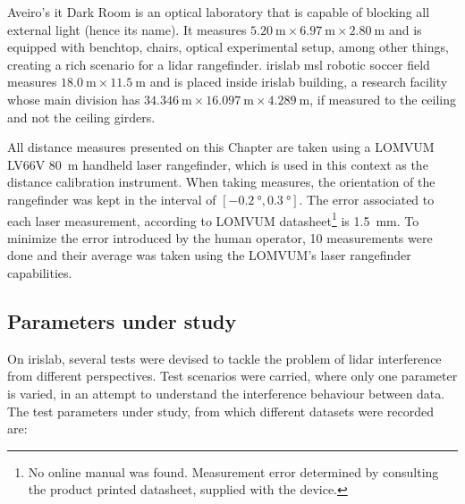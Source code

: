 Aveiro's \ac{it} Dark Room is an optical laboratory that is capable of blocking all external light (hence its name). It measures $\SI{5.20}{\meter} \times \SI{6.97}{\meter} \times \SI{2.80}{\meter}$ and is equipped with benchtop, chairs, optical experimental setup, among other things, creating a rich scenario for a \ac{lidar} rangefinder. 
\ac{irislab} \ac{msl} robotic soccer field measures $\SI{18.0}{\meter} \times \SI{11.5}{\meter}$ and is placed inside \ac{irislab} building, a research facility whose main division has $\SI{34.346}{\meter} \times \SI{16.097}{\meter} \times \SI{4.289}{\meter}$, if measured to the ceiling and not the ceiling girders. 

All distance measures presented on this Chapter are taken using a LOMVUM LV66V \SI{80}{\meter} handheld laser rangefinder, which is used in this context as the distance calibration instrument. When taking measures, the orientation of the rangefinder was kept in the interval of $[\SI{-0.2}{\degree}, \SI{0.3}{\degree}]$. The error associated to each laser measurement, according to LOMVUM datasheet\footnote{No online manual was found. Measurement error determined by consulting the product printed datasheet, supplied with the device.} is \SI{1.5}{\milli\meter}. To minimize the error introduced by the human operator, 10 measurements were done and their average was taken using the LOMVUM's laser rangefinder capabilities.


\subsection{Parameters under study}
\label{subsec:lidar-interference:parameters-under-test}
On \ac{irislab}, several tests were devised to tackle the problem of \ac{lidar} interference from different perspectives. Test scenarios were carried, where only one parameter is varied, in an attempt to understand the interference behaviour between data. The test parameters under study, from which different datasets were recorded are:

